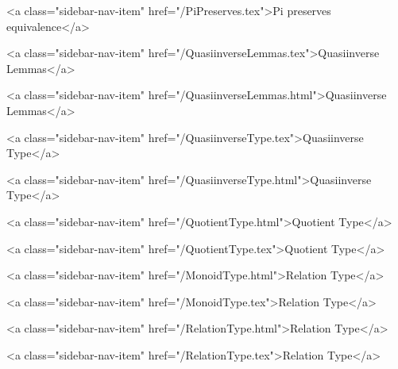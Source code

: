           <a class="sidebar-nav-item" href="/PiPreserves.tex">Pi preserves equivalence</a>
        
      
    
      
        
          <a class="sidebar-nav-item" href="/QuasiinverseLemmas.tex">Quasiinverse Lemmas</a>
        
      
    
      
        
          <a class="sidebar-nav-item" href="/QuasiinverseLemmas.html">Quasiinverse Lemmas</a>
        
      
    
      
        
          <a class="sidebar-nav-item" href="/QuasiinverseType.tex">Quasiinverse Type</a>
        
      
    
      
        
          <a class="sidebar-nav-item" href="/QuasiinverseType.html">Quasiinverse Type</a>
        
      
    
      
        
          <a class="sidebar-nav-item" href="/QuotientType.html">Quotient Type</a>
        
      
    
      
        
          <a class="sidebar-nav-item" href="/QuotientType.tex">Quotient Type</a>
        
      
    
      
        
          <a class="sidebar-nav-item" href="/MonoidType.html">Relation Type</a>
        
      
    
      
        
          <a class="sidebar-nav-item" href="/MonoidType.tex">Relation Type</a>
        
      
    
      
        
          <a class="sidebar-nav-item" href="/RelationType.html">Relation Type</a>
        
      
    
      
        
          <a class="sidebar-nav-item" href="/RelationType.tex">Relation Type</a>
        
      
    
